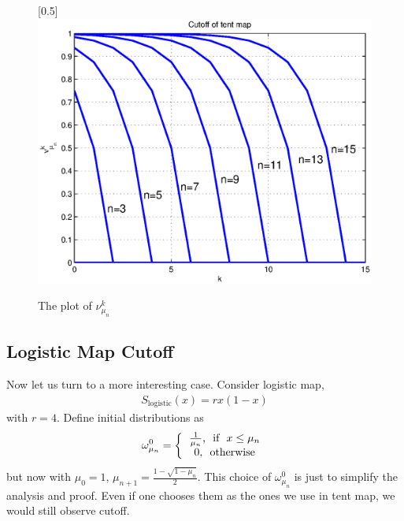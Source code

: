 \documentclass{article}
\begin{document}
\begin{figure}
\caption{\label{tentmapcutoff} The plot of $\nu_{\mu_n}^k$}
\centerline{\scalebox{0.5}[0.5]{\includegraphics{tentmapcutoff.eps}}}
\end{figure}




\subsection{Logistic Map Cutoff}
Now let us turn to a more interesting case. Consider logistic map,  
  \begin{eqnarray}
  \label{logisticmap}
    S_\text{logistic}(x) = rx(1-x)
  \end{eqnarray}
with $r = 4$. Define initial distributions as
  \begin{eqnarray}
  \label{logisticmapinitial}
    \omega_{\mu_n}^0 = \left\{ \begin{tabular}{c}
                      $\frac{1}{\mu_n}$, \mbox{  if  } $x \le \mu_n$\\ 
                      $0$, \mbox{  otherwise} 
                      \end{tabular}\right.
  \end{eqnarray}
but now with  $\mu_0=1$, $\mu_{n+1}=\frac{1-\sqrt{1-\mu_n}}{2}$. This choice of $\omega_{\mu_n}^0$ is just to simplify the analysis and proof. Even if one chooses them as the ones we use in tent map, we would still observe cutoff. 
\end{document}
